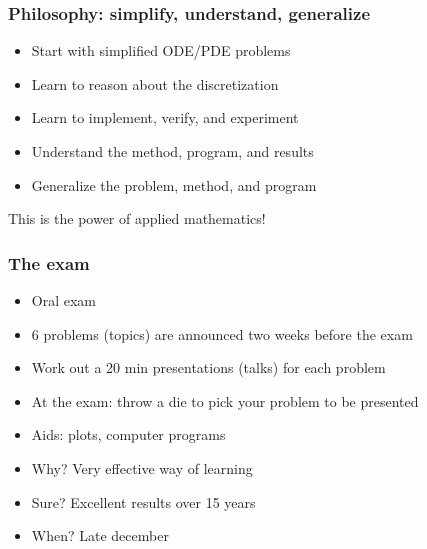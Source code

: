 \documentclass{beamer}
\begin{document}
\begin{frame}
\frametitle{Philosophy: simplify, understand, generalize}

\begin{itemize}
 \item Start with simplified ODE/PDE problems

 \item Learn to reason about the discretization

 \item Learn to implement, verify, and experiment

 \item Understand the method, program, and results

 \item Generalize the problem, method, and program
\end{itemize}

\noindent
This is the power of applied mathematics!
\end{frame}

\begin{frame}
\frametitle{The exam}

\begin{itemize}
\pause
 \item Oral exam

\pause
 \item 6 problems (topics) are announced two weeks before the exam

\pause
 \item Work out a 20 min presentations (talks) for each problem

\pause
 \item At the exam: throw a die to pick your problem to be presented

\pause
 \item Aids: plots, computer programs

\pause
 \item Why? Very effective way of learning

\pause
 \item Sure? Excellent results over 15 years

\pause
 \item When? Late december
\end{itemize}

\noindent
\end{frame}
\end{document}
